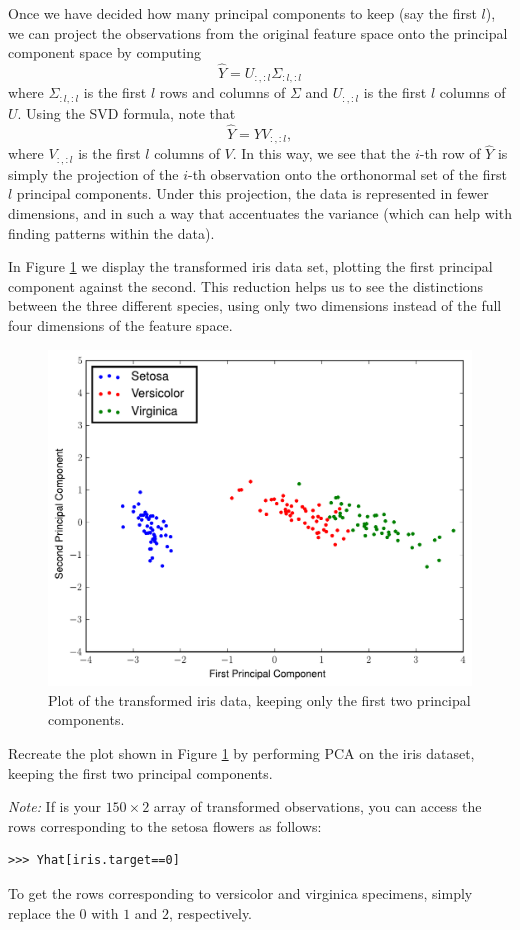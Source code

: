 Once we have decided how many principal components to keep (say the first $l$), we can project the observations from the original feature space onto the principal component space by computing
\begin{equation*}
\widehat{Y} = U_{:,:l}\Sigma_{:l,:l}
\end{equation*}
where $\Sigma_{:l,:l}$ is the first $l$ rows and columns of $\Sigma$ and $U_{:,:l}$ is the first $l$ columns of $U$.
Using the SVD formula, note that
\[
\widehat{Y} = YV_{:,:l},
\]
where $V_{:,:l}$ is the first $l$ columns of $V$.
In this way, we see that the $i$-th row of $\widehat{Y}$ is simply the projection of the $i$-th observation onto the orthonormal set of the first $l$ principal components.
Under this projection, the data is represented in fewer dimensions, and in such a way that accentuates the variance (which can help with finding patterns within the data).

In Figure \ref{fig:iris_pca} we display the transformed iris data set, plotting the first principal component against the second. This reduction helps us to see the distinctions between the three different species, using only two dimensions instead of the full four dimensions of the feature space.
\begin{figure}
\includegraphics[width=\textwidth]{iris_pca.pdf}
\caption{Plot of the transformed iris data, keeping only the first two principal components.}
\label{fig:iris_pca}
\end{figure}

\begin{problem}
Recreate the plot shown in Figure \ref{fig:iris_pca} by performing PCA on the iris dataset, keeping the first two principal components.

\emph{Note:}
If  is your $150 \times 2$ array of transformed observations, you can access the rows corresponding to the setosa flowers as follows:
\begin{lstlisting}
>>> Yhat[iris.target==0]
\end{lstlisting}
To get the rows corresponding to versicolor and virginica specimens, simply replace the $0$ with $1$ and $2$, respectively.
\end{problem}

